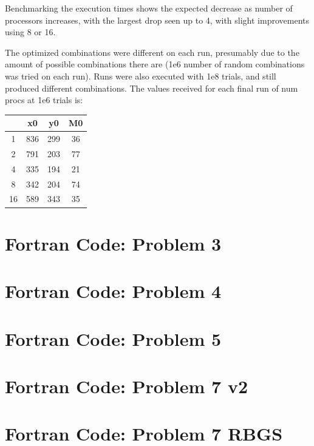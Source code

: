 \documentclass[conf]{new-aiaa}
\begin{document}
Benchmarking the execution times shows the expected decrease as number of processors increases, with the largest drop seen up to 4, with slight improvements using 8 or 16.

The optimized combinations were different on each run, presumably due to the amount of possible combinations there are (1e6 number of random combinations was tried on each run).  Runs were also executed with 1e8 trials, and still produced different combinations.  The values received for each final run of num procs at 1e6 trials is:

\bigskip
\begin{tabular}{ |c|c|c|c| } 
 \hline
	\text{Num Procs} & x0 & y0 & M0 \\ 
 \hline
	1 & 836 & 299 & 36 \\
 \hline
	2 & 791 & 203 & 77 \\
 \hline
	4 & 335 & 194 & 21 \\
 \hline
	8 & 342 & 204 & 74 \\
 \hline
	16 & 589 & 343 & 35 \\
 \hline
\end{tabular}

\newpage

\section*{Fortran Code: Problem 3}

\newpage

\section*{Fortran Code: Problem 4}

\newpage

\section*{Fortran Code: Problem 5}

\newpage

\section*{Fortran Code: Problem 7 v2}

\newpage

\section*{Fortran Code: Problem 7 RBGS}

\newpage
\end{document}
